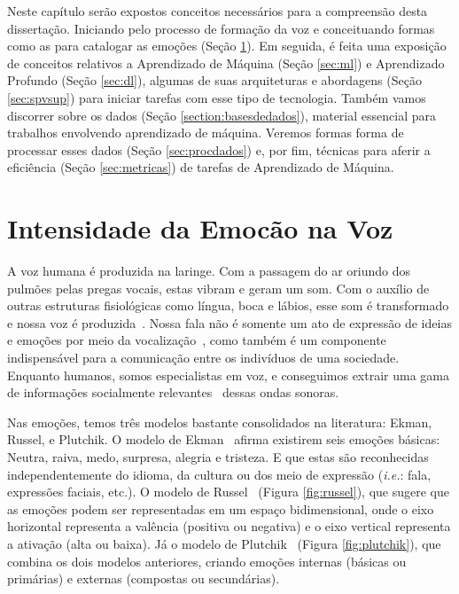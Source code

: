 
Neste capítulo serão expostos conceitos necessários para a compreensão desta dissertação. Iniciando pelo processo de formação da voz e conceituando formas como as para catalogar as emoções (Seção \ref{sec:vozemoint}). Em seguida, é feita uma exposição de conceitos relativos a Aprendizado de Máquina (Seção \ref{sec:ml}) e Aprendizado Profundo (Seção \ref{sec:dl}), algumas de suas arquiteturas e abordagens (Seção \ref{sec:spvsup}) para iniciar tarefas com esse tipo de tecnologia. Também vamos discorrer sobre os dados (Seção \ref{section:basesdedados}), material essencial para trabalhos envolvendo aprendizado de máquina. Veremos formas forma de processar esses dados (Seção \ref{sec:procdados}) e, por fim, técnicas para aferir a eficiência (Seção \ref{sec:metricas}) de tarefas de Aprendizado de Máquina.\\

\section{Intensidade da Emocão na Voz}\label{sec:vozemoint}

A voz humana é produzida na laringe. Com a passagem do ar oriundo dos pulmões pelas pregas vocais, estas vibram e geram um som. Com o auxílio de outras estruturas fisiológicas como língua, boca e lábios, esse som é transformado e nossa voz é produzida~\cite{51}. Nossa fala não é somente um ato de expressão de ideias e emoções por meio da vocalização~\cite{6.31}, como também é um componente indispensável para a comunicação entre os indivíduos de uma sociedade. Enquanto humanos, somos especialistas em voz, e conseguimos extrair uma gama de informações socialmente relevantes~\cite{49} dessas ondas sonoras.

Nas emoções, temos três modelos bastante consolidados na literatura: Ekman, Russel, e Plutchik. O modelo de Ekman~\cite{31.9} afirma existirem seis emoções básicas: Neutra, raiva, medo, surpresa, alegria e tristeza. E que estas são reconhecidas independentemente do idioma, da cultura ou dos meio de expressão (\textit{\textit{i.e.}}: fala, expressões faciais, etc.). O modelo de Russel~\cite{31.10} (Figura \ref{fig:russel}), que sugere que as emoções podem ser representadas em um espaço bidimensional, onde o eixo horizontal representa a valência (positiva ou negativa) e o eixo vertical representa a ativação (alta ou baixa). Já o modelo de Plutchik~\cite{57} (Figura \ref{fig:plutchik}), que combina os dois modelos anteriores, criando emoções internas (básicas ou primárias) e externas (compostas ou secundárias).

